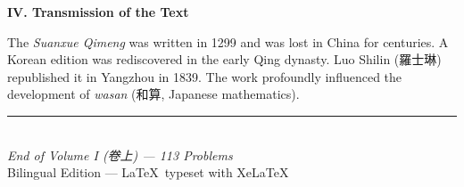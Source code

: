\documentclass[10pt,a4paper]{article}
\begin{document}
{  \smallskip
  \textbf{IV. Transmission of the Text}

  The \textit{Suanxue Qimeng} was written in 1299 and was lost in China for centuries.
  A Korean edition was rediscovered in the early Qing dynasty. Luo Shilin (羅士琳)
  republished it in Yangzhou in 1839. The work profoundly influenced the
  development of \textit{wasan} (和算, Japanese mathematics).
}

\vfill
\begin{center}
\textcolor{rulecolor}{\rule{0.3\textwidth}{0.4pt}}\\[4pt]
{\small\textit{End of Volume I (卷上) --- 113 Problems}}\\[2pt]
{\small Bilingual Edition --- \LaTeX\ typeset with XeLaTeX}
\end{center}
\end{document}
